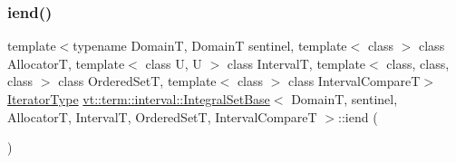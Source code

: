 \mbox{\label{structvt_1_1term_1_1interval_1_1_integral_set_base_a34c4b2af7847cae15a7827fe8b578d1b}} 
\subsubsection{\texorpdfstring{iend()}{iend()}}
{\footnotesize\ttfamily template$<$typename DomainT, DomainT sentinel, template$<$ class $>$ class AllocatorT, template$<$ class U, U $>$ class IntervalT, template$<$ class, class, class $>$ class Ordered\+SetT, template$<$ class $>$ class Interval\+CompareT$>$ \\
\hyperlink{structvt_1_1term_1_1interval_1_1_integral_set_base_a111b2ec1ea960a40ba4270be702f11f1}{Iterator\+Type} \hyperlink{structvt_1_1term_1_1interval_1_1_integral_set_base}{vt\+::term\+::interval\+::\+Integral\+Set\+Base}$<$ DomainT, sentinel, AllocatorT, IntervalT, Ordered\+SetT, Interval\+CompareT $>$\+::iend (\begin{DoxyParamCaption}{ }\end{DoxyParamCaption})\hspace{0.3cm}{\ttfamily [inline]}}

\mbox{\label{structvt_1_1term_1_1interval_1_1_integral_set_base_a7476d33df36a287580cdecc9dd6c2bd1}} 

